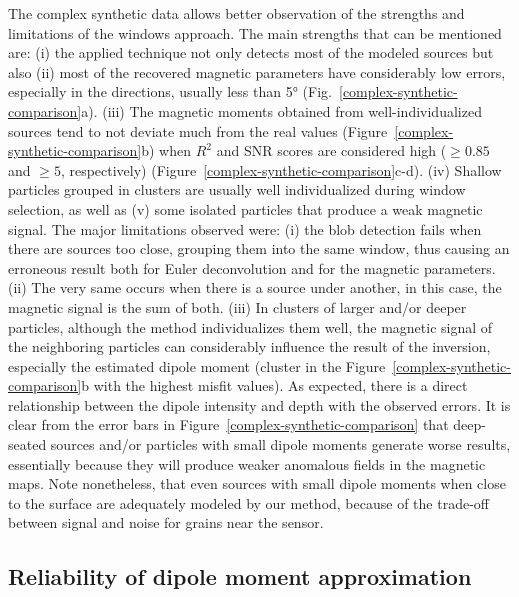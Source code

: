 The complex synthetic data allows better observation of the strengths and limitations of the windows approach.
The main strengths that can be mentioned are: (i) the applied technique not only detects most of the modeled sources but also (ii) most of the recovered magnetic parameters have considerably low errors, especially in the directions, usually less than 5° (Fig.~\ref{complex-synthetic-comparison}a).
(iii) The magnetic moments obtained from well-individualized sources tend to not deviate much from the real values (Figure~\ref{complex-synthetic-comparison}b) when $R^2$ and SNR scores are considered high ($\geq 0.85$ and $\geq 5$, respectively) (Figure~\ref{complex-synthetic-comparison}c-d).
(iv) Shallow particles grouped in clusters are usually well individualized during window selection, as well as (v) some isolated particles that produce a weak magnetic signal.
The major limitations observed were: (i) the blob detection fails when there are sources too close, grouping them into the same window, thus causing an erroneous result both for Euler deconvolution and for the magnetic parameters.
(ii) The very same occurs when there is a source under another, in this case, the magnetic signal is the sum of both.
(iii) In clusters of larger and/or deeper particles, although the method individualizes them well, the magnetic signal of the neighboring particles can considerably influence the result of the inversion, especially the estimated dipole moment (cluster in the Figure~\ref{complex-synthetic-comparison}b with the highest misfit values).
As expected, there is a direct relationship between the dipole intensity and depth with the observed errors.
It is clear from the error bars in Figure~\ref{complex-synthetic-comparison} that deep-seated sources and/or particles with small dipole moments generate worse results, essentially because they will produce weaker anomalous fields in the magnetic maps.
Note nonetheless, that even sources with small dipole moments when close to the surface are adequately modeled by our method, because of the trade-off between signal and noise for grains near the sensor.


\subsection{Reliability of dipole moment approximation}
\label{dipole-reliability}

